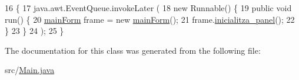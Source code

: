\begin{DoxyCode}
16     \{
17         java.awt.EventQueue.invokeLater (
18                 \textcolor{keyword}{new} Runnable() \{
19                     \textcolor{keyword}{public} \textcolor{keywordtype}{void} run() \{
20                         \hyperlink{classpresentacion_1_1form_1_1mainForm}{mainForm} frame = \textcolor{keyword}{new} \hyperlink{classpresentacion_1_1form_1_1mainForm}{mainForm}();
21                         frame.\hyperlink{classpresentacion_1_1form_1_1mainForm_aae4c847b58c5d50945fa1dd27d534319}{inicialitza\_panel}();
22                     \}
23                 \}
24         );
25     \}
\end{DoxyCode}


The documentation for this class was generated from the following file\+:\begin{DoxyCompactItemize}
\item 
src/\hyperlink{Main_8java}{Main.\+java}\end{DoxyCompactItemize}
